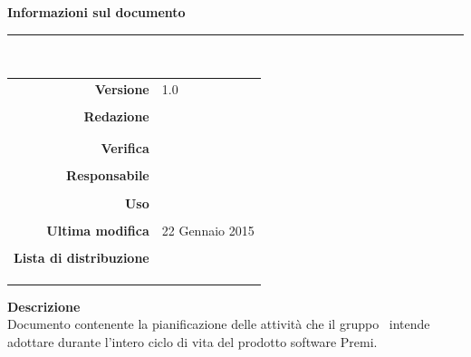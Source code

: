 \begin{titlepage}
\begin{center}
	\vspace{1cm}
	\textbf{Informazioni sul documento}\\
    \rule{10cm}{.4pt} \\
	\begin{table}[h]
	\begin{center}
	\begin{tabular}{r | l}
		\textbf{Versione} & 1.0 \\ \\
		\textbf{Redazione} & \GoIs \\
			& \MaMo \\ \\
		\textbf{Verifica} &\CaMa \\ \\
		\textbf{Responsabile} & \VeFe \\ \\
		\textbf{Uso} & \uso \\ \\
		\textbf{Ultima modifica} & 22 Gennaio 2015 \\ \\
		\textbf{Lista di distribuzione} & \gruppo \\ 
					& \Vardanega \\
					& \Cardin \\
					& \Zucchetti \\
	\end{tabular}
	\end{center}
	\end{table}
			\textbf{Descrizione} \\
Documento contenente la pianificazione delle attività che il gruppo \gruppo\ intende adottare durante l'intero ciclo di vita del prodotto software Premi.
	\end{center}
\end{titlepage}